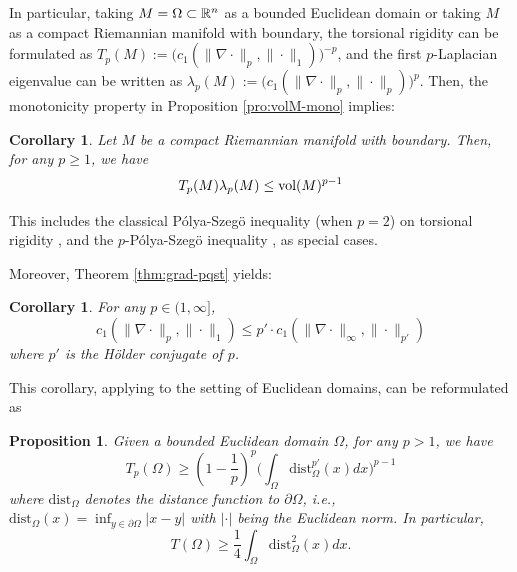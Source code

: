 \documentclass[12pt,a4paper]{article}
\newtheorem{prop}[theorem]{Proposition}
\newtheorem{corollary}[theorem]{Corollary}
\begin{document}
In particular, taking $M=\Omega\subset\mathbb{R}^n$ as a bounded Euclidean domain or taking $M$ as a compact Riemannian manifold with boundary, the torsional rigidity can be formulated as $T_p(M):=\big(c_1( \|\nabla \cdot\|_p,\| \cdot\|_1)\big)^{-p}$, and the first $p$-Laplacian eigenvalue can be written as $\lambda_p(M):=\big(c_1( \|\nabla \cdot\|_p,\| \cdot\|_p)\big)^{p}$. 
Then, the monotonicity property in Proposition \ref{pro:volM-mono} implies: 
\begin{corollary}Let $M$ be a compact Riemannian manifold with boundary. Then, for any $ p\ge 1$, we have 
$$T_p(M)\lambda_p(M)\le \text{\rm vol}(M)^{p-1}$$    
\end{corollary}
This includes the classical P\'olya-Szeg\"o inequality (when $p=2$) on torsional rigidity \cite{Polya51}, and the $p$-P\'olya-Szeg\"o inequality \cite{Della}, as special cases. 








Moreover, Theorem \ref{thm:grad-pqst} yields: 
\begin{corollary}For any $p\in(1,\infty]$, 
$$c_1( \|\nabla \cdot\|_p,\| \cdot\|_1)\le p'\cdot c_1( \|\nabla \cdot\|_{\infty},\| \cdot\|_{p'})$$    
where $p'$ is the H\"older conjugate of $p$. 
\end{corollary}
This corollary, applying to the setting of Euclidean domains, can be reformulated as
\begin{prop}Given a bounded Euclidean domain $\Omega$, for any $p> 1$, we have 
$$ T_p(\Omega)\ge (1-\frac1p)^p \big(\int_\Omega \mathrm{dist}_\Omega^{p'}(x)dx\big)^{p-1} $$
where $\mathrm{dist}_\Omega$ denotes the distance function to $\partial\Omega$, i.e., $\mathrm{dist}_\Omega(x)=\inf_{y\in\partial\Omega}|x-y|$ with $|\cdot|$ being the Euclidean norm. 
In particular, 
$$  T(\Omega)\ge\frac14  \int_\Omega \mathrm{dist}_\Omega^2(x)dx .$$
\end{prop}
\end{document}
